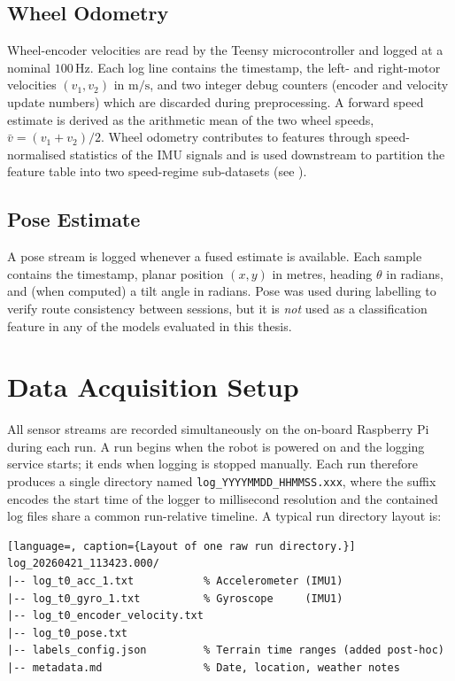 \subsection{Wheel Odometry}

Wheel-encoder velocities are read by the Teensy microcontroller and logged
at a nominal $100\,\text{Hz}$.
Each log line contains the timestamp, the left- and right-motor velocities
$(v_1, v_2)$ in $\text{m}/\text{s}$, and two integer debug counters
(encoder and velocity update numbers) which are discarded during preprocessing.
A forward speed estimate is derived as the arithmetic mean of the two wheel
speeds, $\bar v = (v_1 + v_2)/2$.
Wheel odometry contributes to features through speed-normalised statistics
of the IMU signals and is used downstream to partition the feature table
into two speed-regime sub-datasets (see ).

\subsection{Pose Estimate}

A pose stream is logged whenever a fused estimate is available.
Each sample contains the timestamp, planar position $(x,y)$ in metres,
heading $\theta$ in radians, and (when computed) a tilt angle in radians.
Pose was used during labelling to verify route consistency between sessions,
but it is \emph{not} used as a classification feature in any of the models
evaluated in this thesis.

\section{Data Acquisition Setup}

All sensor streams are recorded simultaneously on the on-board Raspberry Pi
during each run.
A run begins when the robot is powered on and the logging service starts;
it ends when logging is stopped manually.
Each run therefore produces a single directory named
\texttt{log\_YYYYMMDD\_HHMMSS.xxx}, where the suffix encodes the start time
of the logger to millisecond resolution and the contained log files share
a common run-relative timeline.
A typical run directory layout is:

\begin{lstlisting}[language=, caption={Layout of one raw run directory.}]
log_20260421_113423.000/
|-- log_t0_acc_1.txt           % Accelerometer (IMU1)
|-- log_t0_gyro_1.txt          % Gyroscope     (IMU1)
|-- log_t0_encoder_velocity.txt
|-- log_t0_pose.txt
|-- labels_config.json         % Terrain time ranges (added post-hoc)
|-- metadata.md                % Date, location, weather notes
\end{lstlisting}

